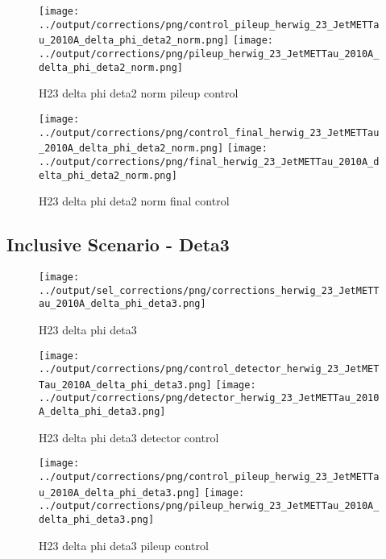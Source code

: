 \documentclass[11pt]{book}
\begin{document}
\begin{figure}[ht]
\centering
\texttt{[image: ../output/corrections/png/control\_pileup\_herwig\_23\_JetMETTau\_2010A\_delta\_phi\_deta2\_norm.png]}
\texttt{[image: ../output/corrections/png/pileup\_herwig\_23\_JetMETTau\_2010A\_delta\_phi\_deta2\_norm.png]}
\caption{H23 delta phi deta2 norm pileup control}
\label{fig:H23_JetMETTau_2010A_delta_phi_deta2_norm_pileup_control}
\end{figure}


\begin{figure}[ht]
\centering
\texttt{[image: ../output/corrections/png/control\_final\_herwig\_23\_JetMETTau\_2010A\_delta\_phi\_deta2\_norm.png]}
\texttt{[image: ../output/corrections/png/final\_herwig\_23\_JetMETTau\_2010A\_delta\_phi\_deta2\_norm.png]}
\caption{H23 delta phi deta2 norm final control}
\label{fig:H23_JetMETTau_2010A_delta_phi_deta2_norm_final_control}
\end{figure}


\clearpage
\subsection{Inclusive Scenario - Deta3}
\begin{figure}[ht]
\centering
\texttt{[image: ../output/sel\_corrections/png/corrections\_herwig\_23\_JetMETTau\_2010A\_delta\_phi\_deta3.png]}
\caption{H23 delta phi deta3}
\label{fig:H23_JetMETTau_2010A_delta_phi_deta3}
\end{figure}


\begin{figure}[ht]
\centering
\texttt{[image: ../output/corrections/png/control\_detector\_herwig\_23\_JetMETTau\_2010A\_delta\_phi\_deta3.png]}
\texttt{[image: ../output/corrections/png/detector\_herwig\_23\_JetMETTau\_2010A\_delta\_phi\_deta3.png]}
\caption{H23 delta phi deta3 detector control}
\label{fig:H23_JetMETTau_2010A_delta_phi_deta3_detector_control}
\end{figure}

\begin{figure}[ht]
\centering
\texttt{[image: ../output/corrections/png/control\_pileup\_herwig\_23\_JetMETTau\_2010A\_delta\_phi\_deta3.png]}
\texttt{[image: ../output/corrections/png/pileup\_herwig\_23\_JetMETTau\_2010A\_delta\_phi\_deta3.png]}
\caption{H23 delta phi deta3 pileup control}
\label{fig:H23_JetMETTau_2010A_delta_phi_deta3_pileup_control}
\end{figure}
\end{document}
